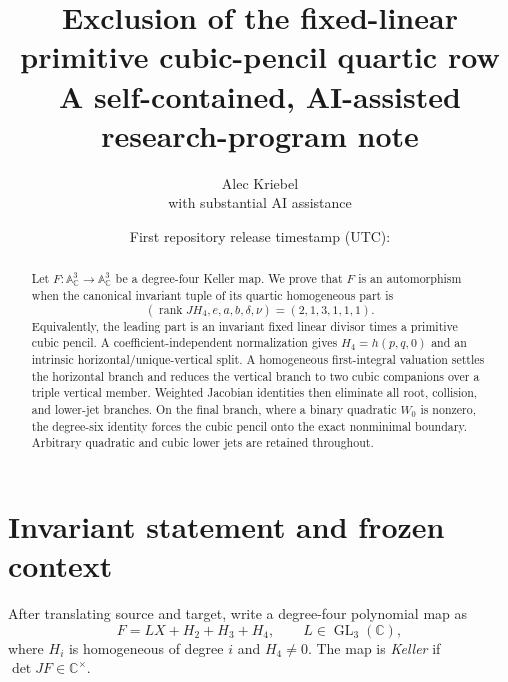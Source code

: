 \documentclass[11pt]{article}
\title{\bfseries Exclusion of the fixed-linear primitive
cubic-pencil quartic row\\[3pt]
\large A self-contained, AI-assisted research-program note}
\author{Alec Kriebel\\with substantial AI assistance}
\date{First repository release timestamp (UTC):
  \texttt{\detokenize{2026-07-25T23:14:47Z}}}
\theoremstyle{remark}
\newcommand{\A}{\mathbb A}
\newcommand{\C}{\mathbb C}
\newcommand{\rank}{\operatorname{rank}}
\begin{document}
\maketitle

\begin{center}
\end{center}

\begin{abstract}
Let $F:\A^3_\C\to\A^3_\C$ be a degree-four Keller map.  We prove that
$F$ is an automorphism when the canonical invariant tuple of its quartic
homogeneous part is
\[
 (\rank JH_4,e,a,b,\delta,\nu)=(2,1,3,1,1,1).
\]
Equivalently, the leading part is an invariant fixed linear divisor times a
primitive cubic pencil.  A coefficient-independent normalization gives
$H_4=h(p,q,0)$ and an intrinsic horizontal/unique-vertical split.  A
homogeneous first-integral valuation settles the horizontal branch and
reduces the vertical branch to two cubic companions over a triple vertical
member.  Weighted Jacobian identities then eliminate all root, collision,
and lower-jet branches.  On the final branch, where a binary quadratic
$W_0$ is nonzero, the degree-six identity forces the cubic pencil onto the
exact nonminimal boundary.  Arbitrary quadratic and cubic lower jets are
retained throughout.
\end{abstract}

\section{Invariant statement and frozen context}

After translating source and target, write a degree-four polynomial map as
\begin{equation}
 F=LX+H_2+H_3+H_4, \qquad L\in\operatorname{GL}_3(\C),
 \label{eq:F}
\end{equation}
where $H_i$ is homogeneous of degree $i$ and $H_4\ne0$.  The map is
\emph{Keller} if $\det JF\in\C^\times$.
\end{document}
